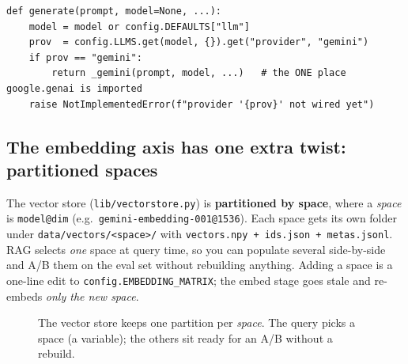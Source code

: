 \documentclass[11pt]{article}
\newcommand{\code}[1]{\texttt{#1}}
\begin{document}
\begin{lstlisting}
def generate(prompt, model=None, ...):
    model = model or config.DEFAULTS["llm"]
    prov  = config.LLMS.get(model, {}).get("provider", "gemini")
    if prov == "gemini":
        return _gemini(prompt, model, ...)   # the ONE place google.genai is imported
    raise NotImplementedError(f"provider '{prov}' not wired yet")
\end{lstlisting}

\subsection{The embedding axis has one extra twist: partitioned spaces}

The vector store (\code{lib/vectorstore.py}) is \textbf{partitioned by space}, where a \emph{space} is
\code{model@dim} (e.g.\ \code{gemini-embedding-001@1536}). Each space gets its own folder under
\code{data/vectors/<space>/} with \code{vectors.npy + ids.json + metas.jsonl}. RAG selects \emph{one}
space at query time, so you can populate several side-by-side and A/B them on the eval set without
rebuilding anything. Adding a space is a one-line edit to \code{config.EMBEDDING\_MATRIX}; the embed
stage goes stale and re-embeds \emph{only the new space}.

\begin{figure}[h]
\centering
{}
\caption{The vector store keeps one partition per \emph{space}. The query picks a space (a variable);
the others sit ready for an A/B without a rebuild.}
\end{figure}
\end{document}
